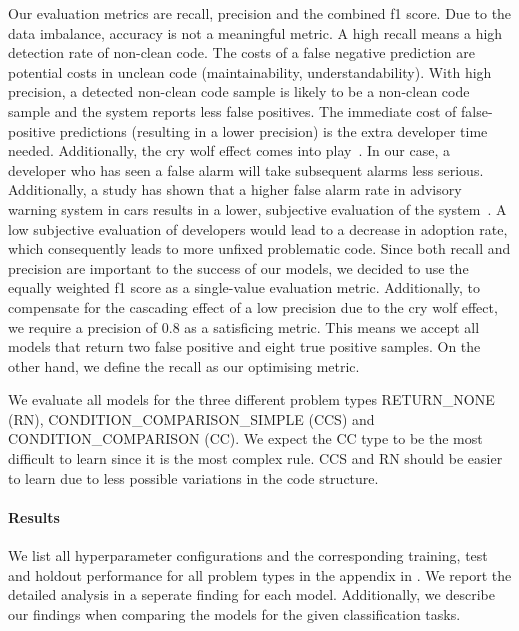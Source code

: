 Our evaluation metrics are recall, precision and the combined f1 score. Due to the data imbalance, accuracy is not a meaningful metric. A high recall means a high detection rate of non-clean code. The costs of a false negative prediction are potential costs in unclean code (maintainability, understandability). With high precision, a detected non-clean code sample is likely to be a non-clean code sample and the system reports less false positives. The immediate cost of false-positive predictions (resulting in a lower precision) is the extra developer time needed. Additionally, the cry wolf effect comes into play~\cite{breznitz_cry_1984}. In our case, a developer who has seen a false alarm will take subsequent alarms less serious. Additionally, a study has shown that a higher false alarm rate in advisory warning system in cars results in a lower, subjective evaluation of the system~\cite{naujoks_cooperative_2016}. A low subjective evaluation of developers would lead to a decrease in adoption rate, which consequently leads to more unfixed problematic code. Since both recall and precision are important to the success of our models, we decided to use the equally weighted f1 score as a single-value evaluation metric.
Additionally, to compensate for the cascading effect of a low precision due to the cry wolf effect, we require a precision of 0.8 as a satisficing metric. This means we accept all models that return two false positive and eight true positive samples. On the other hand, we define the recall as our optimising metric.

We evaluate all models for the three different problem types RETURN\_NONE (RN), CONDITION\_COMPARISON\_SIMPLE (CCS) and CONDITION\_COMPARISON (CC). We expect the CC type to be the most difficult to learn since it is the most complex rule. CCS and RN should be easier to learn due to less possible  variations in the code structure.

\paragraph{Results}
We list all hyperparameter configurations and the corresponding training, test and holdout performance for all problem types in the appendix in . We report the detailed analysis in a seperate finding for each model. Additionally, we describe our findings when comparing the models for the given classification tasks.



